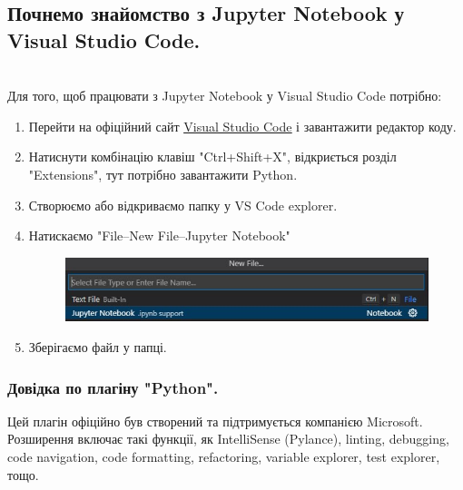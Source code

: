 \documentclass[a4paper,12pt]{article}
\begin{document}
    \subsection {Почнемо знайомство з Jupyter Notebook у Visual Studio Code.}
    \hrulefill \\
    Для того, щоб працювати з Jupyter Notebook у Visual Studio Code потрібно:
    \begin{enumerate}
        \item Перейти на офіційний сайт \href{https://code.visualstudio.com/}{\underline{Visual Studio Code}} і завантажити редактор коду.
        \item Натиснути комбінацію клавіш "Ctrl+Shift+X", відкриється  розділ "Extensions", тут потрібно завантажити Python. 
        \item Створюємо або відкриваємо папку у VS Code explorer.
        \item Натискаємо "File--New File--Jupyter Notebook"
        \begin{figure}[h!]
            \begin{center}
                \includegraphics[scale=0.9]{Prt sc/Figure_5.jpg}
            \end{center}
        \end{figure}
        \item Зберігаємо файл у папці.
    \end{enumerate}
    \hrulefill
    \begin{center}
        \subsubsection{Довідка по плагіну "Python".}
    \end{center}
    \hrulefill 

    Цей плагін офіційно був створений та підтримується компанією Microsoft. Розширення включає такі функції, як 
    IntelliSense (Pylance), linting, debugging, code navigation, code formatting, refactoring, variable explorer, test explorer, тощо. 
\end{document}
